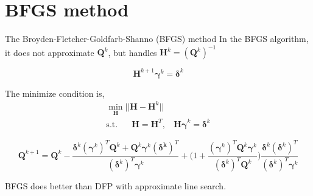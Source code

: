 \documentclass{beamer}
\begin{document}
\section{BFGS method}
\begin{frame}{The Broyden-Fletcher-Goldfarb-Shanno (BFGS) method}
In the BFGS algorithm, it does not approximate $\boldsymbol{Q}^k$, but handles $\boldsymbol{H}^k = (\boldsymbol{Q}^k)^{-1}$

\begin{equation*}
    \boldsymbol{H}^{k+1}\boldsymbol{\gamma}^{k} = \boldsymbol{\delta}^{k}    
\end{equation*}

The minimize condition is,
\begin{gather*}
    \underset{\boldsymbol{H}}{\min} ||\boldsymbol{H} - \boldsymbol{H}^{k}|| \\
		{\textrm{s.t.~~~~~}} \boldsymbol{H} = \boldsymbol{H}^T,~~~~    \boldsymbol{H \gamma}^k = \boldsymbol{\delta}^k
\end{gather*}

\begin{equation*}
    \boldsymbol{Q}^{k+1} = \boldsymbol{Q}^k - 
    \frac{\boldsymbol{\delta}^k (\boldsymbol{\gamma}^k)^T \boldsymbol{Q}^k + \boldsymbol{Q}^k\boldsymbol{\gamma}^k (\boldsymbol{\delta^k})^T}
    {(\boldsymbol{\delta}^k)^T \boldsymbol{\gamma}^k} 
    + \bigg(1 + \frac{(\boldsymbol{\gamma}^k)^T \boldsymbol{Q}^k \boldsymbol{\gamma}^k}{(\boldsymbol{\delta}^k)^T \boldsymbol{Q}^k}\bigg)
    \frac{\boldsymbol{\delta}^k (\boldsymbol{\delta}^k)^T}{(\boldsymbol{\delta}^k)^T \boldsymbol{\gamma}^k}
\end{equation*}

BFGS does better than DFP with approximate line search. 
\end{frame}
\end{document}
